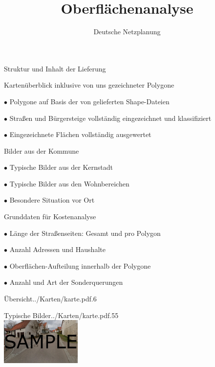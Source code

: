 \documentclass[11pt, dvipsnames,aspectratio=169]{beamer}
\author[DNP]{Deutsche Netzplanung}
\title[Oberflächenanalyse \Ort{} (\Kreis, \Land)]{\textbf{Oberflächenanalyse} \\ \Ort}
\date{\Abgabedatum}
\begin{document}
	
{
	\maketitle
}

\begin{frame}{Struktur und Inhalt der Lieferung \Ort}
	\begin{bulletlist}{5pt}
		\item Kartenüberblick inklusive von uns gezeichneter Polygone
			\begin{bulletlist}{3pt}
				\item[$\bullet$] Polygone auf Basis der von \Kunde{} gelieferten Shape-Dateien
				\item[$\bullet$] Straßen und Bürgersteige vollständig eingezeichnet und klassifiziert
				\item[$\bullet$] Eingezeichnete Flächen vollständig ausgewertet
			\end{bulletlist}
		\item Bilder aus der Kommune
		\begin{bulletlist}{3pt}
			\item[$\bullet$] Typische Bilder aus der Kernstadt
			\item[$\bullet$] Typische Bilder aus den Wohnbereichen
			\item[$\bullet$] Besondere Situation vor Ort
		\end{bulletlist}
		\item Grunddaten für Kostenanalyse
		\begin{bulletlist}{3pt}
			\item[$\bullet$] Länge der Straßenseiten: Gesamt und pro Polygon
			\item[$\bullet$] Anzahl Adressen und Haushalte
			\item[$\bullet$] Oberflächen-Aufteilung innerhalb der Polygone
			\item[$\bullet$] Anzahl und Art der Sonderquerungen
		\end{bulletlist}
	\end{bulletlist}
\end{frame}

\begin{mapframe}{Übersicht}{../Karten/karte.pdf}{.6\linewidth}
	\scriptsize
	\begin{itemize}
		\surfacetypes
	\end{itemize}
\end{mapframe}

\begin{mapframe}{Typische Bilder}{../Karten/karte.pdf}{.55\textwidth}
	\centering
	 \\[.3cm]
	\includegraphics[width=4cm]{../Bilder/innenstadt.png} \\
	\scriptsize \bildeins
\end{mapframe}
\end{document}
